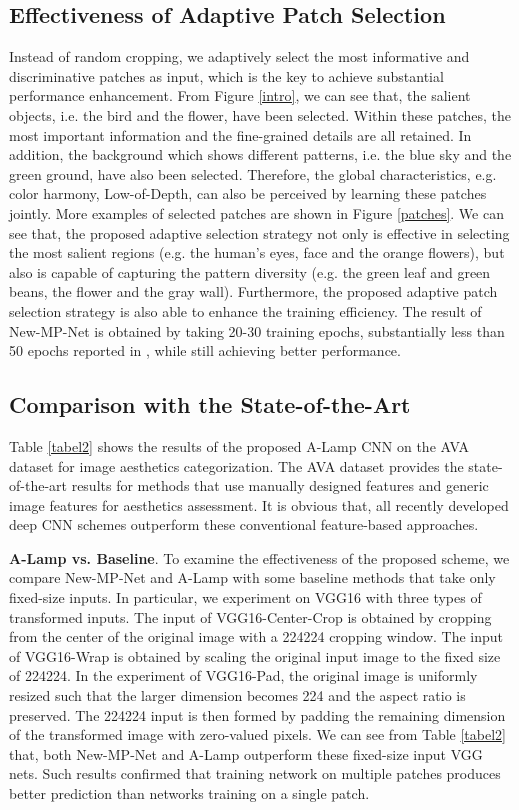 \documentclass[10pt,twocolumn,letterpaper]{article}
\begin{document}
	\subsection{Effectiveness of Adaptive Patch Selection}
	Instead of random cropping, we adaptively select the most informative and discriminative patches as input, which is the key to achieve substantial performance enhancement. From Figure \ref{intro}, we can see that, the salient objects, i.e. the bird and the flower, have been selected. Within these patches, the most important information and the fine-grained details are all retained. In addition, the background which shows different patterns, i.e. the blue sky and the green ground, have also been selected. Therefore, the global characteristics, e.g. color harmony, Low-of-Depth, can also be perceived by learning these patches jointly. More examples of selected patches are shown in Figure \ref{patches}. We can see that, the proposed adaptive selection strategy not only is effective in selecting the most salient regions (e.g. the human's eyes, face and the orange flowers), but also is capable of capturing the pattern diversity (e.g. the green leaf and green beans, the flower and the gray wall). Furthermore, the proposed adaptive patch selection strategy is also able to enhance the training efficiency. The result of New-MP-Net is obtained by taking 20-30 training epochs, substantially less than 50 epochs reported in \cite{Lu:2015:ICCV}, while still achieving  better performance. 
	
	\subsection{Comparison with the State-of-the-Art}
	Table \ref{tabel2} shows the results of the proposed A-Lamp CNN on the AVA dataset \cite{Murray:MMP2012:AVA} for image aesthetics categorization. The AVA dataset provides the state-of-the-art results for methods that use manually designed features and generic image features for aesthetics assessment. It is obvious that, all recently developed deep CNN schemes outperform these conventional feature-based approaches.
	
	\textbf{A-Lamp vs. Baseline}.
	To examine the effectiveness of the proposed scheme, we compare New-MP-Net and A-Lamp with some baseline methods that take only fixed-size inputs. In particular, we experiment on VGG16 with three types of transformed inputs.
	The input of VGG16-Center-Crop is obtained by cropping  from the center of the original image with a 224224 cropping window. The input of VGG16-Wrap is obtained by scaling the original input image to the fixed size of 224224. In the experiment of VGG16-Pad, the original image is uniformly resized such that the larger dimension becomes 224 and the aspect ratio is preserved. The 224224 input is then formed by padding the remaining dimension of the transformed image with zero-valued pixels.
	We can see from Table \ref{tabel2} that, both New-MP-Net and A-Lamp outperform these fixed-size input VGG nets. Such results confirmed that training network on multiple patches produces better prediction than networks training on a single patch.
	
\end{document}
